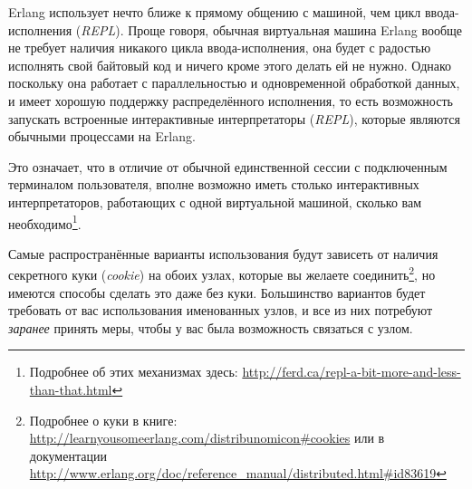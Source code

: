Erlang использует нечто ближе к прямому общению с машиной, чем цикл ввода-исполнения (\emph{REPL}). Проще говоря, обычная виртуальная машина Erlang вообще не требует наличия никакого цикла ввода-исполнения, она будет с радостью исполнять свой байтовый код и ничего кроме этого делать ей не нужно. Однако поскольку она работает с параллельностью и одновременной обработкой данных, и имеет хорошую поддержку распределённого исполнения, то есть возможность запускать встроенные интерактивные интерпретаторы (\emph{REPL}), которые являются обычными процессами на Erlang.

Это означает, что в отличие от обычной единственной сессии с подключенным терминалом пользователя, вполне возможно иметь столько интерактивных интерпретаторов, работающих с одной виртуальной машиной, сколько вам необходимо\footnote{Подробнее об этих механизмах здесь: \href{http://ferd.ca/repl-a-bit-more-and-less-than-that.html}{http://ferd.ca/repl-a-bit-more-and-less-than-that.html}}.

Самые распространённые варианты использования будут зависеть от наличия секретного куки (\emph{cookie}) на обоих узлах, которые вы желаете соединить\footnote{Подробнее о куки в книге: \href{http://learnyousomeerlang.com/distribunomicon\#cookies}{http://learnyousomeerlang.com/distribunomicon\#cookies} или в документации
\href{http://www.erlang.org/doc/reference\_manual/distributed.html\#id83619}{http://www.erlang.org/doc/reference\_manual/distributed.html\#id83619}}, но имеются способы сделать это даже без куки. Большинство вариантов будет требовать от вас использования именованных узлов, и все из них потребуют \emph{заранее} принять меры, чтобы у вас была возможность связаться с узлом. 



